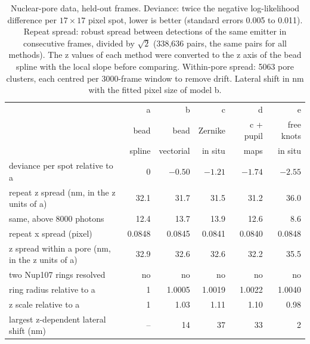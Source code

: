 \documentclass[11pt,a4paper]{article}
\begin{document}
\begin{table}[t]\centering\small
\begin{tabular}{lrrrrr}\toprule
 & a & b & c & d & e\\
 & bead & bead & Zernike & c + pupil & free knots\\
 & spline & vectorial & in situ & maps & in situ\\ \midrule
deviance per spot relative to a & 0 & $-0.50$ & $-1.21$ & $-1.74$ & $-2.55$\\
repeat z spread (nm, in the z units of a) & 32.1 & 31.7 & 31.5 & 31.2 & 36.0\\
same, above 8000 photons & 12.4 & 13.7 & 13.9 & 12.6 & 8.6\\
repeat x spread (pixel) & 0.0848 & 0.0845 & 0.0841 & 0.0840 & 0.0848\\
z spread within a pore (nm, in the z units of a) & 32.9 & 32.6 & 32.6 & 32.2 & 35.5\\
two Nup107 rings resolved & no & no & no & no & no\\
ring radius relative to a & 1 & 1.0005 & 1.0019 & 1.0022 & 1.0040\\
z scale relative to a & 1 & 1.03 & 1.11 & 1.10 & 0.98\\
largest z-dependent lateral shift (nm) & -- & 14 & 37 & 33 & 2\\ \bottomrule
\end{tabular}
\caption{Nuclear-pore data, held-out frames. Deviance: twice the negative log-likelihood difference per
$17\times17$ pixel spot, lower is better (standard errors 0.005 to 0.011). Repeat spread: robust spread between
detections of the same emitter in consecutive frames, divided by $\sqrt2$ (338{,}636 pairs, the same pairs for
all methods). The z values of each method were converted to the z axis of the bead spline with the local slope
before comparing. Within-pore spread: 5063 pore clusters, each centred per 3000-frame window to remove drift.
Lateral shift in nm with the fitted pixel size of model b.}\label{tab:real}
\end{table}
\end{document}
